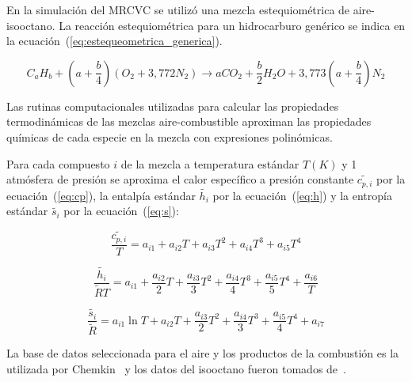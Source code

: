 En la simulación del MRCVC se utilizó una mezcla estequiométrica de
aire-isooctano.
%
La reacción estequiométrica para un hidrocarburo genérico se indica en la
ecuación~(\ref{eq:estequeometrica_generica}).

\begin{equation} \label{eq:estequeometrica_generica}
  C_{a}H_{b} + \left(a + \frac{b}{4}\right) \left(O_{2}+3,772N_{2}\right) \rightarrow a CO_{2} + \frac{b}{2} H_{2}O + 3,773 \left(a + \frac{b}{4}\right) N_{2}
\end{equation}

Las rutinas computacionales utilizadas para calcular las propiedades
termodinámicas de las mezclas aire-combustible aproximan las propiedades
químicas de cada especie en la mezcla con expresiones polinómicas.

Para cada compuesto $i$ de la mezcla a temperatura estándar $T(K)$ y 1 atmósfera
de presión se aproxima el calor específico a presión constante
$\widetilde{c_{p,i}}$ por la ecuación~(\ref{eq:cp}), la entalpía estándar
$\widetilde{h_{i}}$ por la ecuación~(\ref{eq:h}) y la entropía estándar
$\widetilde{s_{i}}$ por la ecuación~(\ref{eq:s}):


\begin{equation}\label{eq:cp} \frac{\widetilde{c_{p,i}}}{T} = a_{i1} + a_{i2}T + a_{i3}T^{2} + a_{i4}T^{3} + a_{i5}T^{4}
\end{equation}

\begin{equation}\label{eq:h} \frac{\widetilde{h_{i}}}{\widetilde{R}T} = a_{i1} + \frac{a_{i2}}{2}T + \frac{a_{i3}}{3}T^{2} + \frac{a_{i4}}{4}T^{3} + \frac{a_{i5}}{5}T^{4} +\frac{a_{i6}}{T}
\end{equation}

\begin{equation}\label{eq:s} \frac{\widetilde{s_{i}}}{\widetilde{R}} = a_{i1} \ln{T} + a_{i2}T + \frac{a_{i3}}{2}T^{2} + \frac{a_{i4}}{3}T^{3} + \frac{a_{i5}}{4}T^{4} + a_{i7}
\end{equation}


La base de datos seleccionada para el aire y los productos de la combustión es
la utilizada por Chemkin~\parencite{chemkin} y los datos del isooctano fueron
tomados de~\cite{raine}.

